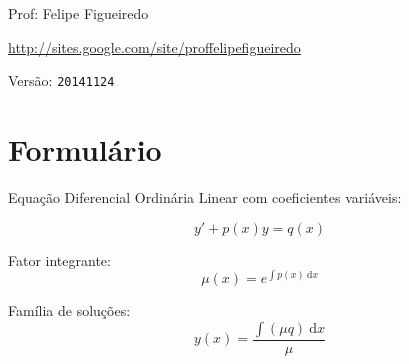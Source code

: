 \documentclass[a4paper]{article}
\newcommand{\ud}{\mathrm{\ d}}
\begin{document}
\parbox[c]{.825\textwidth}{\raggedright%
{Prof: Felipe Figueiredo\par}
{\url{http://sites.google.com/site/proffelipefigueiredo}\par}
}

Versão: \verb|20141124|



\section{Formulário}

Equação Diferencial Ordinária Linear com coeficientes variáveis:

\begin{displaymath}
  y' + p(x)y = q(x)
\end{displaymath}

Fator integrante:
\begin{displaymath}
  \mu (x) = e^{\int p(x)\ud x}
\end{displaymath}

Família de soluções:
\begin{displaymath}
  y(x) = \frac{\int (\mu q) \ud x}{\mu}
\end{displaymath}
\end{document}
